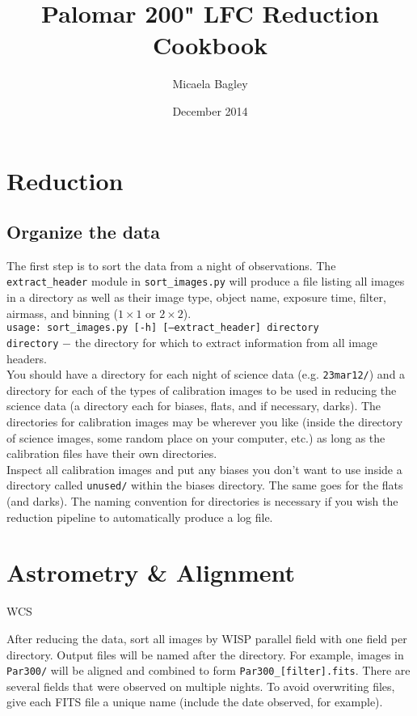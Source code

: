 \documentclass{article}
\title{Palomar 200" LFC Reduction Cookbook}
\author{Micaela Bagley}
\date{December 2014}
\begin{document}
\maketitle

\section{Reduction}
\subsection{Organize the data}
The first step is to sort the data from a night of observations. 
The \texttt{extract\_header} module in \texttt{sort\_images.py} will
produce a file listing all images in a directory as well as their
image type, object name, exposure time, filter, airmass, and binning 
($1\times1$ or $2\times2$).\\

\texttt{usage: sort\_images.py [-h] [--extract\_header] directory} \\

\texttt{directory} $-$ \hangindent=2.7cm the directory for which to extract
information from all image headers.\\

\noindent You should have a directory for each night of science data (e.g.
\texttt{23mar12/}) and a directory for each of the types of calibration 
images to be used in reducing the science data (a directory each for 
biases, flats, and if necessary, darks). The directories for calibration 
images may be wherever you like (inside the
directory of science images, some random place on your computer, etc.)
as long as the calibration files have their own directories. \\

\noindent Inspect all calibration images and put any biases you don't 
want to use inside a directory called \texttt{unused/} within the biases 
directory. The same goes for the flats (and darks). The naming convention
for directories is necessary if you wish the reduction pipeline to 
automatically produce a log file. 

\vspace{3 mm}
\section{Astrometry \& Alignment}
WCS 

After reducing the data, sort all images by WISP parallel field with
one field per directory. Output files will be named after the directory.
For example, images in \texttt{Par300/} will be aligned and combined
to form \texttt{Par300\_[filter].fits}.
There are several fields that were observed on multiple nights. To avoid 
overwriting files, give each FITS file a unique name 
(include the date observed, for example). \\
\end{document}
